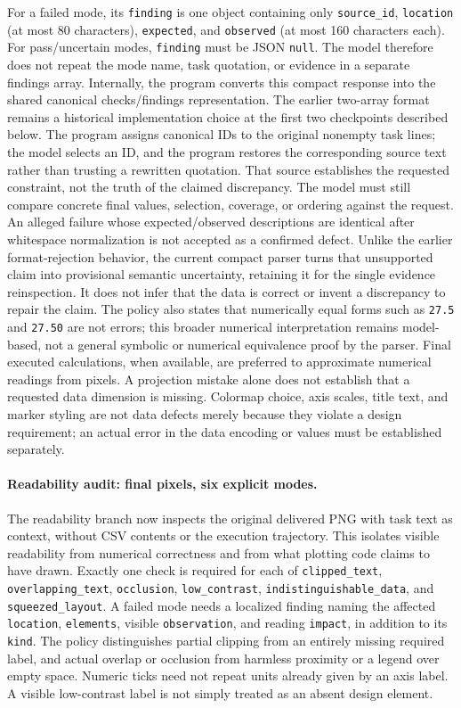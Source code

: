 \documentclass[11pt]{article}
\begin{document}
For a failed mode, its \texttt{finding} is one object containing only
\texttt{source\_id}, \texttt{location} (at most 80 characters),
\texttt{expected}, and \texttt{observed} (at most 160 characters each).
For pass/uncertain modes, \texttt{finding} must be JSON \texttt{null}.
The model therefore does not repeat the mode name, task quotation, or
evidence in a separate findings array. Internally, the program converts
this compact response into the shared canonical checks/findings
representation. The earlier two-array format remains a historical
implementation choice at the first two checkpoints described below.
The program assigns canonical IDs to the original nonempty task lines;
the model selects an ID, and the program restores the corresponding
source text rather than trusting a rewritten quotation.
That source establishes the requested constraint, not the truth of the
claimed discrepancy. The model must still compare concrete final values,
selection, coverage, or ordering against the request.
An alleged failure whose expected/observed descriptions are identical
after whitespace normalization is not accepted as a confirmed defect.
Unlike the earlier format-rejection behavior, the current compact parser
turns that unsupported claim into provisional semantic uncertainty,
retaining it for the single evidence reinspection. It does not infer
that the data is correct or invent a discrepancy to repair the claim.
The policy also states that
numerically equal forms such as \texttt{27.5} and \texttt{27.50} are not
errors; this broader numerical interpretation remains model-based,
not a general symbolic or numerical equivalence proof by the parser.
Final executed calculations, when available, are preferred to approximate
numerical readings from pixels. A projection mistake alone does not
establish that a requested data dimension is missing. Colormap choice,
axis scales, title text, and marker styling are not data defects merely
because they violate a design requirement; an actual error in the data
encoding or values must be established separately.

\paragraph{Readability audit: final pixels, six explicit modes.}
The readability branch now inspects the original delivered PNG with
task text as context, without CSV contents or the execution trajectory.
This isolates visible readability from numerical correctness and from
what plotting code claims to have drawn. Exactly one check is required
for each of \texttt{clipped\_text}, \texttt{overlapping\_text},
\texttt{occlusion}, \texttt{low\_contrast},
\texttt{indistinguishable\_data}, and \texttt{squeezed\_layout}.
A failed mode needs a localized finding naming the affected
\texttt{location}, \texttt{elements}, visible \texttt{observation}, and
reading \texttt{impact}, in addition to its \texttt{kind}.
The policy distinguishes partial clipping from an entirely missing
required label, and actual overlap or occlusion from harmless proximity
or a legend over empty space. Numeric ticks need not repeat units already
given by an axis label. A visible low-contrast label is not simply
treated as an absent design element.
\end{document}
